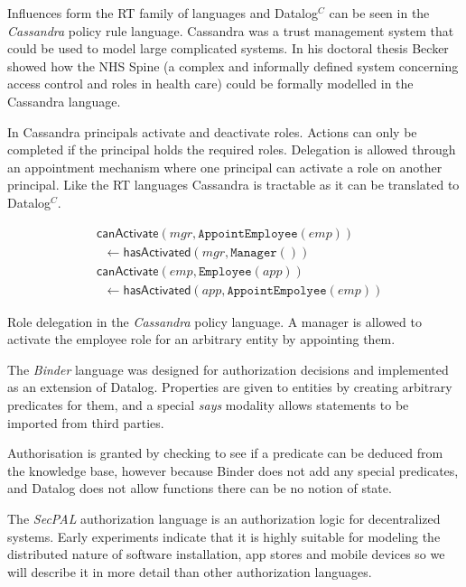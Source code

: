 \documentclass[a4paper,sfsidenotes]{tufte-book}
\begin{document}
Influences form the RT family of languages and Datalog$^C$ can be seen in the
\emph{Cassandra} policy rule language\cite{Becker:2004fi}. Cassandra was a
trust management system that could be used to model large complicated systems.
In his doctoral thesis Becker showed how the NHS Spine (a complex and informally
defined system concerning access control and roles in health care) could be
formally modelled in the Cassandra language.

In Cassandra principals activate and deactivate roles. Actions can only be completed if the
principal holds the required roles. Delegation is allowed through an
appointment mechanism where one principal can activate a role on another
principal. Like the RT languages Cassandra is tractable as it can be translated
to Datalog$^C$.

\begin{marginfigure}\label{code:cassandra}
  \begin{align*}
    &\textsf{canActivate}(mgr, \texttt{AppointEmployee}(emp)) \\
    &\;\;\gets \textsf{hasActivated}(mgr, \texttt{Manager}()) \\
    &\textsf{canActivate}(emp, \texttt{Employee}(app)) \\
    &\;\;\gets \textsf{hasActivated}(app, \texttt{AppointEmpolyee}(emp))
  \end{align*}
  \caption{Role delegation in the \emph{Cassandra} policy language. A manager is
  allowed to activate the employee role for an arbitrary entity by appointing
  them.}
\end{marginfigure}

The \emph{Binder} language\cite{DeTreville:2002ff} was designed for authorization
decisions\cite{Abadi:2003kt} and implemented as an extension of Datalog.
Properties are given to entities by creating arbitrary predicates for them, and
a special \emph{says} modality allows statements to be imported from third
parties.

Authorisation is granted by checking to see if a predicate can be deduced from
the knowledge base, however because Binder does not add any special predicates,
and Datalog does not allow functions there can be no notion of state.

The \emph{{SecPAL}} authorization language\cite{Becker:2006vh} is an authorization
logic for decentralized systems. Early experiments indicate that it is highly
suitable for modeling the distributed nature of software installation, app
stores and mobile devices so we will describe it in more detail than other
authorization languages.
\end{document}
